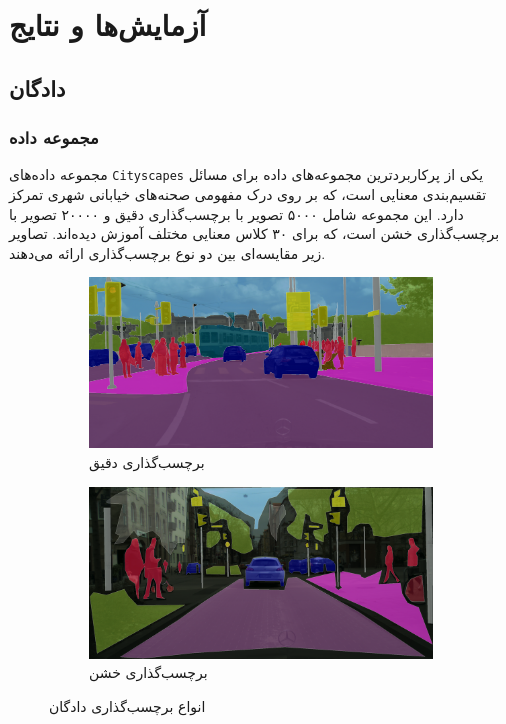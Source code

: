 \chapter{آزمایش‌ها و نتایج}

\section{دادگان}

\subsection{مجموعه داده }

مجموعه داده‌های \verb*|Cityscapes| یکی از پرکاربردترین مجموعه‌های داده برای مسائل تقسیم‌بندی معنایی است، که بر روی درک مفهومی صحنه‌های خیابانی شهری تمرکز دارد. این مجموعه شامل ۵۰۰۰ تصویر با برچسب‌گذاری دقیق و ۲۰۰۰۰ تصویر با برچسب‌گذاری خشن است، که برای ۳۰ کلاس معنایی مختلف آموزش دیده‌اند. تصاویر زیر مقایسه‌ای بین دو نوع برچسب‌گذاری ارائه می‌دهند.

\begin{figure}[ht]
	\centering
	\begin{subfigure}{0.45\textwidth}
		\includegraphics[width=\linewidth, height=0.2\textheight]{Images/Chapter2/Cityscapes/zuerich00.png}
		\caption{برچسب‌گذاری دقیق}
		\label{f64}
	\end{subfigure}\hfil
	\begin{subfigure}{0.45\textwidth}
		\includegraphics[width=\linewidth, height=0.2\textheight]{Images/Chapter2/Cityscapes/nuremberg00.png}
		\caption{برچسب‌گذاری خشن}
		\label{f65}
	\end{subfigure}
	\caption{انواع بر‌چسب‌گذاری دادگان }
	\label{fig:fig1}
\end{figure}

